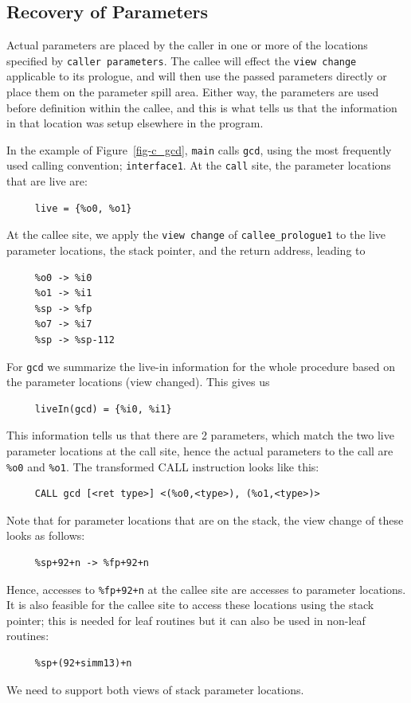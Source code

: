 \subsection{Recovery of Parameters}
Actual parameters are placed by the caller in one or more of the
locations specified by \texttt{caller parameters}.  The callee
will effect the \texttt{view change} applicable to its prologue, 
and will then use the passed parameters directly or place them 
on the parameter spill area.  Either way, the parameters are 
used before definition within the callee, and this is what 
tells us that the information in that location was setup elsewhere
in the program. 

In the example of Figure~\ref{fig-c_gcd}, \texttt{main} calls 
\texttt{gcd}, using the most frequently used calling convention;  
\texttt{interface1}.  
At the \texttt{call} site, the parameter locations that are live are: 
\begin{verbatim}
     live = {%o0, %o1}
\end{verbatim}
At the callee site, we apply the \texttt{view change} of 
\texttt{callee\_prologue1} to the live parameter locations, the 
stack pointer, and the return address, leading to
\begin{verbatim}
     %o0 -> %i0
     %o1 -> %i1
     %sp -> %fp
     %o7 -> %i7
     %sp -> %sp-112
\end{verbatim}
For \texttt{gcd} we summarize the live-in information for the whole 
procedure based on the parameter locations (view changed).  This gives us
\begin{verbatim}
     liveIn(gcd) = {%i0, %i1}
\end{verbatim}
This information tells us that there are 2 parameters, which match the
two live parameter locations at the call site, hence the actual 
parameters to the call are \texttt{\%o0} and \texttt{\%o1}.  The 
transformed CALL instruction looks like this:
\begin{verbatim}
     CALL gcd [<ret type>] <(%o0,<type>), (%o1,<type>)>
\end{verbatim}

Note that for parameter locations that are on the stack, the 
view change of these looks as follows:
\begin{verbatim}
     %sp+92+n -> %fp+92+n
\end{verbatim}
Hence, accesses to \texttt{\%fp+92+n} at the callee site are 
accesses to parameter locations.  It is also feasible for the
callee site to access these locations using the stack pointer; 
this is needed for leaf routines but it can also be used in 
non-leaf routines: 
\begin{verbatim}
     %sp+(92+simm13)+n
\end{verbatim}
We need to support both views of stack parameter locations.


